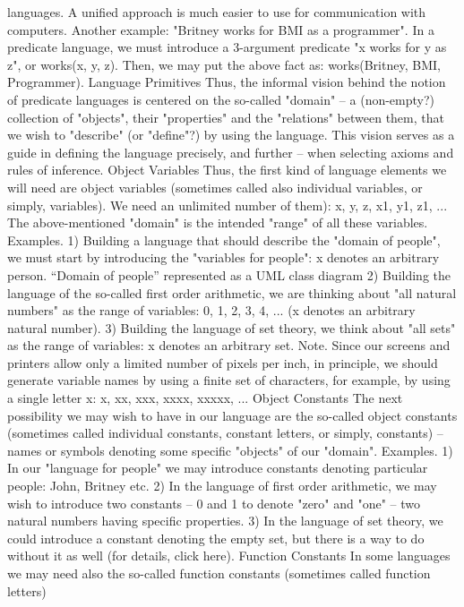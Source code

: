 languages. A unified approach is much easier to use for communication with computers.
Another example: "Britney works for BMI as a programmer". In a predicate language, we must introduce a 3-argument
predicate "x works for y as z", or works(x, y, z). Then, we may put the above fact as: works(Britney, BMI, Programmer).
Language Primitives
Thus, the informal vision behind the notion of predicate languages is centered on the so-called "domain"
– a (non-empty?) collection of "objects", their "properties" and the "relations" between them, that we wish
to "describe" (or "define"?) by using the language. This vision serves as a guide in defining the language
precisely, and further – when selecting axioms and rules of inference.
Object Variables
Thus, the first kind of language elements we will need are object variables (sometimes called also
individual variables, or simply, variables). We need an unlimited number of them):
x, y, z, x1, y1, z1, ...
The above-mentioned "domain" is the intended "range" of all these variables.
Examples. 1) Building a language that should describe the "domain of people", we must start by introducing the "variables for
people": x denotes an arbitrary person.
“Domain of people” represented as a UML class diagram
2) Building the language of the so-called first order arithmetic, we are thinking about "all natural numbers" as the range of
variables: 0, 1, 2, 3, 4, ... (x denotes an arbitrary natural number).
3) Building the language of set theory, we think about "all sets" as the range of variables: x denotes an arbitrary set.
Note. Since our screens and printers allow only a limited number of pixels per inch, in principle, we
should generate variable names by using a finite set of characters, for example, by using a single letter x:
x, xx, xxx, xxxx, xxxxx, ...
Object Constants
The next possibility we may wish to have in our language are the so-called object constants (sometimes
called individual constants, constant letters, or simply, constants) – names or symbols denoting some
specific "objects" of our "domain".
Examples. 1) In our "language for people" we may introduce constants denoting particular people: John, Britney etc.
2) In the language of first order arithmetic, we may wish to introduce two constants – 0 and 1 to denote "zero" and "one" – two
natural numbers having specific properties.
3) In the language of set theory, we could introduce a constant denoting the empty set, but there is a way to do without it as
well (for details, click here).
Function Constants
In some languages we may need also the so-called function constants (sometimes called function letters)
